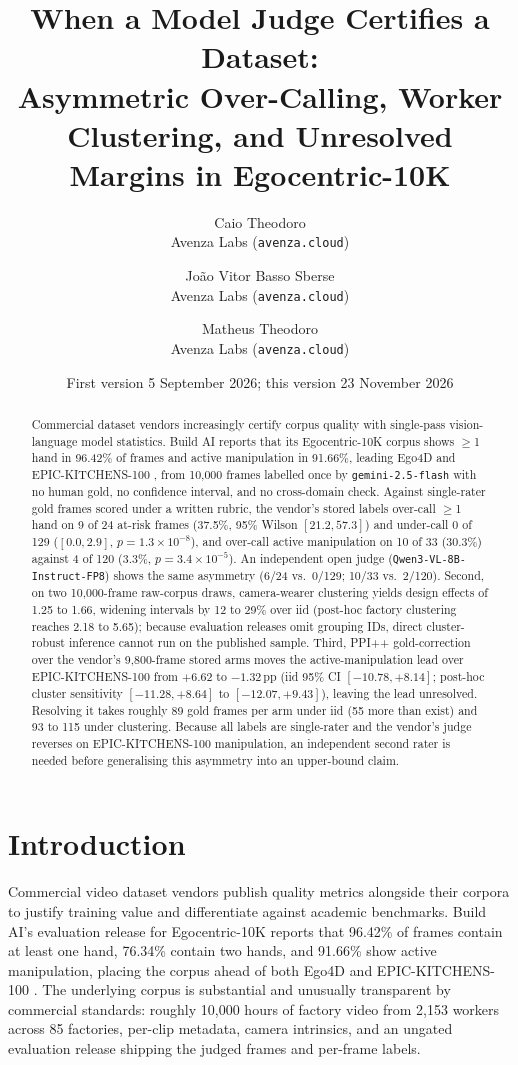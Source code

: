 \documentclass[11pt]{article}
\title{When a Model Judge Certifies a Dataset:\\
Asymmetric Over-Calling, Worker Clustering, and Unresolved Margins in Egocentric-10K}
\author{Caio Theodoro\\\small Avenza Labs (\texttt{avenza.cloud}) \and Jo\~{a}o Vitor Basso Sberse\\\small Avenza Labs (\texttt{avenza.cloud}) \and Matheus Theodoro\\\small Avenza Labs (\texttt{avenza.cloud})}
\date{First version 5 September 2026; this version 23 November 2026}
\begin{document}
\maketitle

\begin{abstract}
\noindent
Commercial dataset vendors increasingly certify corpus quality with single-pass vision-language
model statistics. Build AI reports that its Egocentric-10K corpus shows $\geq$1 hand in 96.42\%
of frames and active manipulation in 91.66\%, leading Ego4D \citep{grauman2022ego4d} and
EPIC-KITCHENS-100 \citep{damen2022epic100}, from 10{,}000 frames labelled once by
\texttt{gemini-2.5-flash} with no human gold, no confidence interval, and no cross-domain check.
Against \vernierNPrimary{} single-rater gold frames scored under a written rubric, the vendor's
stored labels over-call $\geq$1 hand on 9 of 24 at-risk frames (37.5\%, 95\% Wilson
$[21.2, 57.3]$) and under-call 0 of 129 ($[0.0, 2.9]$, $p = 1.3\times 10^{-8}$), and over-call
active manipulation on 10 of 33 (30.3\%) against 4 of 120 (3.3\%, $p = 3.4\times 10^{-5}$). An
independent open judge (\texttt{Qwen3-VL-8B-Instruct-FP8}) shows the same asymmetry (6/24 vs.\
0/129; 10/33 vs.\ 2/120). Second, on two 10{,}000-frame raw-corpus draws, camera-wearer
clustering yields design effects of 1.25 to 1.66, widening intervals by 12 to 29\% over iid
(post-hoc factory clustering reaches 2.18 to 5.65); because evaluation releases omit grouping
IDs, direct cluster-robust inference cannot run on the published sample. Third, PPI++
gold-correction over the vendor's 9{,}800-frame stored arms moves the active-manipulation lead
over EPIC-KITCHENS-100 from $+6.62$ to $-1.32$\,pp (iid 95\% CI $[-10.78, +8.14]$; post-hoc
cluster sensitivity $[-11.28, +8.64]$ to $[-12.07, +9.43]$), leaving the lead unresolved.
Resolving it takes roughly 89 gold frames per arm under iid (55 more than exist) and 93 to 115
under clustering. Because all \vernierNPrimary{} labels are single-rater and the vendor's judge
reverses on EPIC-KITCHENS-100 manipulation, an independent second rater is needed before
generalising this asymmetry into an upper-bound claim.
\end{abstract}

\section{Introduction}
\label{sec:intro}

Commercial video dataset vendors publish quality metrics alongside their corpora to justify
training value and differentiate against academic benchmarks. Build AI's evaluation release for
Egocentric-10K reports that 96.42\% of frames contain at least one hand, 76.34\% contain two
hands, and 91.66\% show active manipulation, placing the corpus ahead of both Ego4D
\citep{grauman2022ego4d} and EPIC-KITCHENS-100 \citep{damen2022epic100}. The underlying corpus is
substantial and unusually transparent by commercial standards: roughly 10{,}000 hours of factory
video from 2{,}153 workers across 85 factories, per-clip metadata, camera intrinsics, and an
ungated evaluation release shipping the judged frames and per-frame labels.
\end{document}
